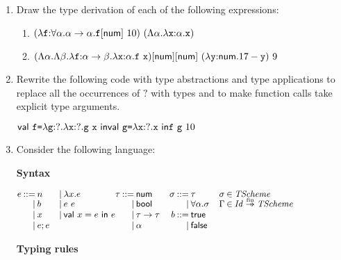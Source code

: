 \begin{enumerate}
\item Draw the type derivation of each of the following expressions:
  \begin{enumerate}
    \item
      $(\efunt{\cf}{\tforall{\alpha}{\tarrow{\alpha}{\alpha}}}{
        \etapp{\cf}{\tnum}\ 10})\ (\etfun{\alpha}{\efunt{\cx}{\alpha}{\cx}})$
    \item
      $
        \etapp{\etapp{(\etfun{\alpha}{\etfun{\beta}{
          \efunt{\cf}{\tarrow{\alpha}{\beta}}{
            \efunt{\cx}{\alpha}{\cf\ \cx}
          }
        }})}{\tnum}}{\tnum}\ (\efunt{\cy}{\tnum}{17-\cy})\ 9
      $
  \end{enumerate}

\item Rewrite the following code with type abstractions and type applications
to replace all the occurrences of $?$ with types
and to make function calls take explicit type arguments.

$
\ebind{\cf}{\efunt{\code{g}}{?}{\efunt{\cx}{?}{\code{g}\ \cx}}}{\\
\ebind{\code{g}}{\efunt{\cx}{?}{\cx}}{\\
\cf\ \code{g}\ 10}}
$

\item Consider the following language:

\textbf{Syntax}
    \vspace{0.5em}

$
  \small
\begin{array}{@{}r@{\hskip2pt}r@{\hskip2pt}l
  r@{\hskip2pt}l@{\hskip0pt}
  r@{\hskip2pt}r@{\hskip2pt}l@{\hskip10pt}
  r@{\hskip2pt}r@{\hskip2pt}l@{\hskip10pt}
  r@{\hskip2pt}c@{\hskip2pt}l}
  e &::= & n &|& \lambda x.e & \tau &::= & \textsf{num} & \sigma &::=& \tau &
  \sigma&\in&\embox{TScheme}\\[-3pt]
  &|& b &|& e\ e &&|& \tbool &&|& \forall\alpha.\sigma &
  \Gamma&\in&\embox{Id}\finto\embox{TScheme}\\
  &|& x &|& \textsf{val}\ x=e\ \textsf{in}\ e &&|& \tau\rightarrow\tau
  &b&::=&\textsf{true} \\
  &|& e;e &&&&|& \alpha &&|&\textsf{false} \\
\end{array}
$

    \vspace{0.5em}
\textbf{Typing rules}
    \vspace{0.5em}


\end{enumerate}
